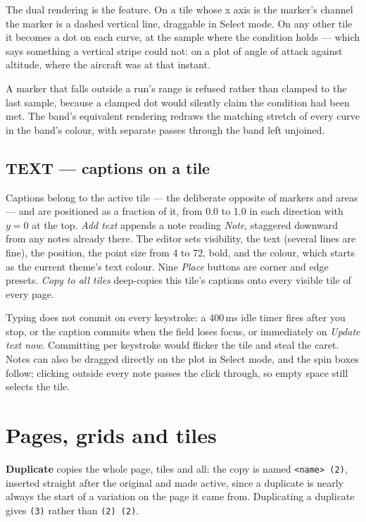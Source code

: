 \documentclass[11pt,a4paper,oneside]{report}
\newcommand{\code}[1]{\texttt{#1}}
\begin{document}
The dual rendering is the feature. On a tile whose x axis is the marker's channel
the marker is a dashed vertical line, draggable in Select mode. On any other tile
it becomes a dot on each curve, at the sample where the condition holds --- which
says something a vertical stripe could not: on a plot of angle of attack against
altitude, where the aircraft was at that instant.

A marker that falls outside a run's range is refused rather than clamped to the
last sample, because a clamped dot would silently claim the condition had been
met. The band's equivalent rendering redraws the matching stretch of every curve
in the band's colour, with separate passes through the band left unjoined.

\section{TEXT --- captions on a tile}

Captions belong to the active tile --- the deliberate opposite of markers and
areas --- and are positioned as a fraction of it, from 0.0 to 1.0 in each
direction with $y = 0$ at the top. \emph{Add text} appends a note reading
\emph{Note}, staggered downward from any notes already there. The editor sets
visibility, the text (several lines are fine), the position, the point size from
4 to 72, bold, and the colour, which starts as the current theme's text colour.
Nine \emph{Place} buttons are corner and edge presets. \emph{Copy to all tiles}
deep-copies this tile's captions onto every visible tile of every page.

Typing does not commit on every keystroke: a 400\,ms idle timer fires after you
stop, or the caption commits when the field loses focus, or immediately on
\emph{Update text now}. Committing per keystroke would flicker the tile and
steal the caret. Notes can also be dragged directly on the plot in Select mode,
and the spin boxes follow; clicking outside every note passes the click through,
so empty space still selects the tile.

\chapter{Pages, grids and tiles}

\textbf{Duplicate} copies the whole page, tiles and all: the copy is named
\code{<name> (2)}, inserted straight after the original and made active, since a
duplicate is nearly always the start of a variation on the page it came from.
Duplicating a duplicate gives \code{(3)} rather than \code{(2) (2)}.
\end{document}
